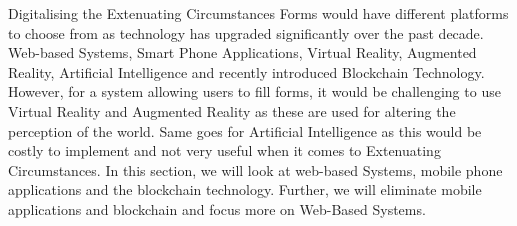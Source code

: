 \documentclass[../main.tex]{subfiles}
\begin{document}
\raggedright
Digitalising the Extenuating Circumstances Forms would have different platforms to choose from as technology has upgraded significantly over the past decade. Web-based Systems, Smart Phone Applications, Virtual Reality, Augmented Reality, Artificial Intelligence\cite{forbestop7} and recently introduced Blockchain Technology. However, for a system allowing users to fill forms, it would be challenging to use Virtual Reality and Augmented Reality as these are used for altering the perception of the world\cite{arvr}. Same goes for Artificial Intelligence as this would be costly to implement and not very useful when it comes to Extenuating Circumstances. In this section, we will look at web-based Systems, mobile phone applications and the blockchain technology. Further, we will eliminate mobile applications and blockchain and focus more on Web-Based Systems.
\end{document}
